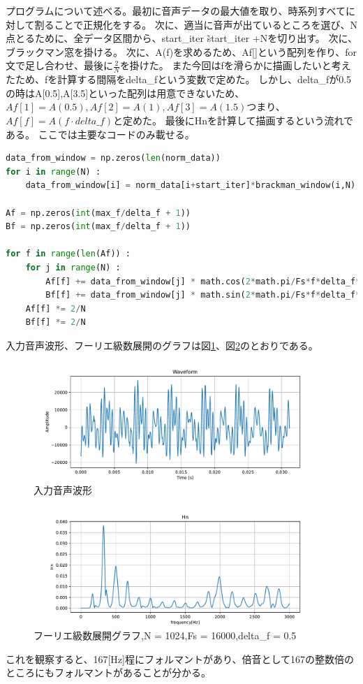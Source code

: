 \documentclass[a4j,11pt]{jarticle}
\begin{document}
    プログラムについて述べる。最初に音声データの最大値を取り、時系列すべてに対して割ることで正規化をする。
    次に、適当に音声が出ているところを選び、N点とるために、全データ区間から、start\_iter \~ start\_iter +Nを切り出す。
    次に、ブラックマン窓を掛ける。
    次に、A(f)を求めるため、Af[]という配列を作り、for文で足し合わせ、最後に$\frac 2 N$を掛けた。
    また今回はfを滑らかに描画したいと考えたため、fを計算する間隔をdelta\_fという変数で定めた。
    しかし、delta\_fが0.5の時はA[0.5],A[3.5]といった配列は用意できないため、$Af[1] = A(0.5), Af[2] = A(1), Af[3] = A(1.5)$つまり、
    $Af[f] = A(f\cdot delta\_f)$と定めた。
    最後にHnを計算して描画するという流れである。
    ここでは主要なコードのみ載せる。
    \begin{lstlisting}[language = Python , caption = fourier.py]
data_from_window = np.zeros(len(norm_data))
for i in range(N) :
    data_from_window[i] = norm_data[i+start_iter]*brackman_window(i,N)

Af = np.zeros(int(max_f/delta_f + 1))
Bf = np.zeros(int(max_f/delta_f + 1))

for f in range(len(Af)) :
    for j in range(N) :
        Af[f] += data_from_window[j] * math.cos(2*math.pi/Fs*f*delta_f*j)
        Bf[f] += data_from_window[j] * math.sin(2*math.pi/Fs*f*delta_f*j)
    Af[f] *= 2/N
    Bf[f] *= 2/N
    \end{lstlisting}
    入力音声波形、フーリエ級数展開のグラフは図\ref{fig:input}、図\ref{fig:fourier}のとおりである。
    \begin{figure}[tb]
        \centering
        \includegraphics[width=0.8\hsize]{../../figure/arayurugennzituwo.pdf}
        \caption{入力音声波形}
        \label{fig:input}
    \end{figure}
    \begin{figure}[tb]
        \centering
        \includegraphics[width=0.8\hsize]{../../figure/arayurugennzituwo_Hn.pdf}
        \caption{フーリエ級数展開グラフ,N = 1024,Fs = 16000,delta\_f = 0.5}
        \label{fig:fourier}
    \end{figure}
    これを観察すると、167[Hz]程にフォルマントがあり、倍音として167の整数倍のところにもフォルマントがあることが分かる。
\end{document}

